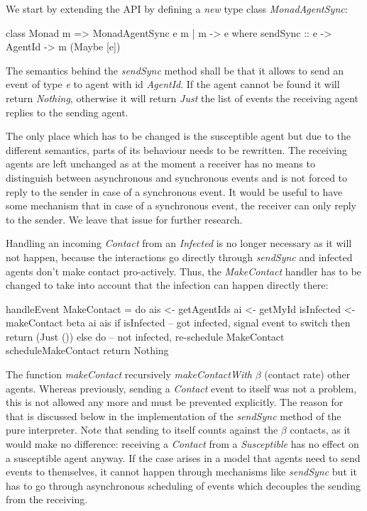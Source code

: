 We start by extending the API by defining a \textit{new} type class \textit{MonadAgentSync}:

\begin{HaskellCode}
class Monad m => MonadAgentSync e m | m -> e where
  sendSync :: e -> AgentId -> m (Maybe [e])
\end{HaskellCode}

The semantics behind the \textit{sendSync} method shall be that it allows to send an event of type \textit{e} to agent with id \textit{AgentId}. If the agent cannot be found it will return \textit{Nothing}, otherwise it will return \textit{Just} the list of events the receiving agent replies to the sending agent. 

The only place which has to be changed is the susceptible agent but due to the different semantics, parts of its behaviour needs to be rewritten. The receiving agents are left unchanged as at the moment a receiver has no means to distinguish between asynchronous and synchronous events and is not forced to reply to the sender in case of a synchronous event. It would be useful to have some mechanism that in case of a synchronous event, the receiver can only reply to the sender. We leave that issue for further research.

Handling an incoming \textit{Contact} from an \textit{Infected} is no longer necessary as it will not happen, because the interactions go directly through \textit{sendSync} and infected agents don't make contact pro-actively. Thus, the \textit{MakeContact} handler has to be changed to take into account that the infection can happen directly there:

\begin{HaskellCode}
handleEvent MakeContact = do
  ais        <- getAgentIds
  ai         <- getMyId
  isInfected <- makeContact beta ai ais
  if isInfected
    -- got infected, signal event to switch
    then return (Just ())
    else do
      -- not infected, re-schedule MakeContact
      scheduleMakeContact
      return Nothing
\end{HaskellCode}

The function \textit{makeContact} recursively \textit{makeContactWith} $\beta$ (contact rate) other agents. Whereas previously, sending a \textit{Contact} event to itself was not a problem, this is not allowed any more and must be prevented explicitly. The reason for that is discussed below in the implementation of the \textit{sendSync} method of the pure interpreter. Note that sending to itself counts against the $\beta$ contacts, as it would make no difference: receiving a \textit{Contact} from a \textit{Susceptible} has no effect on a susceptible agent anyway. If the case arises in a model that agents need to send events to themselves, it cannot happen through mechanisms like \textit{sendSync} but it has to go through asynchronous scheduling of events which decouples the sending from the receiving.


